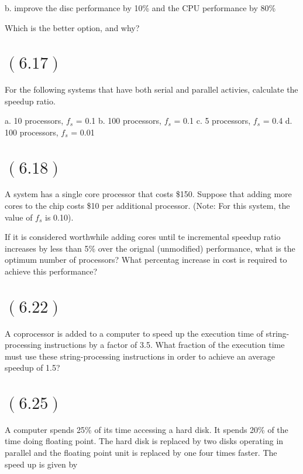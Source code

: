 \documentclass[letterpaper,12pt,titlepage]{article}
\begin{document}
b. improve the disc performance by 10\% and the CPU performance by 80\%

Which is the better option, and why?

\begin{mdframed}[style=MyFrame]
\end{mdframed}

\section*{$(6.17)$} For the following systems that have both serial and parallel activies, calculate the speedup ratio.

a. 10 processors, $f_s$ = 0.1
b. 100 processors, $f_s$ = 0.1
c. 5 processors, $f_s$ = 0.4
d. 100 processors, $f_s$ = 0.01

\begin{mdframed}[style=MyFrame]
\end{mdframed}

\section*{$(6.18)$} A system has a single core processor that costs \$150. Suppose that adding more cores to the chip costs \$10 per additional processor. (Note: For this system, the value of $f_s$ is 0.10).

If it is considered worthwhile adding cores until te incremental speedup ratio increases by less than 5\% over the orignal (unmodified) performance, what is the optimum number of processors? What percentag increase in cost is required to achieve this performance?

\begin{mdframed}[style=MyFrame]
\end{mdframed}

\section*{$(6.22)$} A coprocessor is added to a computer to speed up the execution time of string-processing instructions by a factor of 3.5. What fraction of the execution time must use these string-processing instructions in order to achieve an average speedup of 1.5?

\begin{mdframed}[style=MyFrame]
\end{mdframed}

\section*{$(6.25)$} A computer spends 25\% of its time accessing a hard disk. It spends 20\% of the time doing floating point. The hard disk is replaced by two disks operating in parallel and the floating point unit is replaced by one four times faster. The speed up is given by
\end{document}
